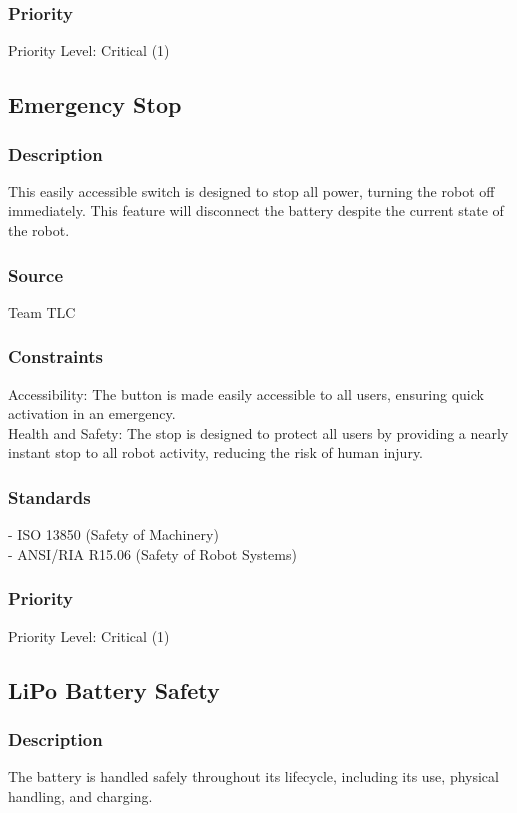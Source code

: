 \subsubsection{Priority}
Priority Level: Critical (1)
\newpage



\subsection{Emergency Stop}
\subsubsection{Description}
This easily accessible switch is designed to stop all power, turning the robot off immediately. This feature will disconnect the battery despite the current state of the robot.

\subsubsection{Source}
Team TLC

\subsubsection{Constraints}
Accessibility: The button is made easily accessible to all users, ensuring quick activation in an emergency.\\
Health and Safety: The stop is designed to protect all users by providing a nearly instant stop to all robot activity, reducing the risk of human injury.

\subsubsection{Standards}
- ISO 13850 (Safety of Machinery)\\
- ANSI/RIA R15.06 (Safety of Robot Systems)

\subsubsection{Priority}
Priority Level: Critical (1)



\subsection{LiPo Battery Safety}
\subsubsection{Description}
The battery is handled safely throughout its lifecycle, including its use, physical handling, and charging.

